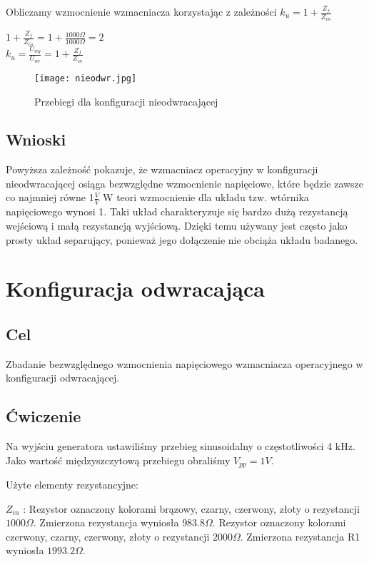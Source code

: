 \documentclass[polish,a4paper]{article}
\begin{document}
Obliczamy wzmocnienie wzmacniacza korzystając z zależności $k_u=1+ \frac{Z_{f}}{Z_{in}}$

\begin{center}

$1+ \frac{Z_{f}}{Z_{in}}=1 + \frac{1000\Omega}{1000\Omega}=2$ \\
$k_u=\frac{U_{wy}}{U_{we}}=1+ \frac{Z_{f}}{Z_{in}}$
\end{center}


\begin{figure}[H]
\centering
\texttt{[image: nieodwr.jpg]}
\caption{Przebiegi dla konfiguracji nieodwracającej}
\end{figure}

\subsection{Wnioski}

Powyższa  zależność  pokazuje,  że  wzmacniacz  operacyjny  w  konfiguracji  nieodwracającej  osiąga bezwzględne wzmocnienie napięciowe, które będzie zawsze co najmniej równe 1$\frac{V}{V}$
W teori wzmocnienie dla układu tzw. wtórnika napięciowego wynosi 1.
Taki układ charakteryzuje się bardzo dużą rezystancją wejściową i małą rezystancją wyjściową. Dzięki temu używany jest często jako prosty układ separujący, ponieważ jego dołączenie nie obciąża układu badanego. 


\section{Konfiguracja odwracająca}
\subsection{Cel}
Zbadanie bezwzględnego wzmocnienia napięciowego wzmacniacza operacyjnego w konfiguracji odwracającej.

\subsection{Ćwiczenie}
Na wyjściu generatora ustawiliśmy przebieg sinusoidalny o częstotliwości 4 kHz. Jako wartość międzyszczytową przebiegu obraliśmy $V_{pp}=1V$.

Użyte elementy rezystancyjne: 

$Z_{in}$ :
Rezystor oznaczony kolorami brązowy, czarny, czerwony, złoty o rezystancji $1000\Omega$. Zmierzona rezystancja wyniosła $983.8\Omega$. Rezystor oznaczony kolorami czerwony, czarny, czerwony, złoty o rezystancji $2000\Omega$. Zmierzona rezystancja R1 wyniosła $1993.2\Omega$. 
\end{document}
